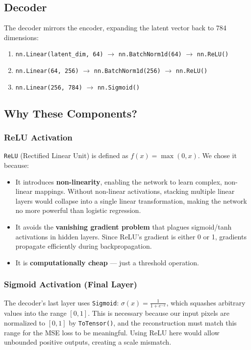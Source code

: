 \documentclass[12pt,a4paper]{article}
\begin{document}
\subsection{Decoder}
The decoder mirrors the encoder, expanding the latent vector back to 784 dimensions:
\begin{enumerate}
    \item \texttt{nn.Linear(latent\_dim, 64)} $\rightarrow$ \texttt{nn.BatchNorm1d(64)} $\rightarrow$ \texttt{\textcolor{accentorange}{nn.ReLU()}}
    \item \texttt{nn.Linear(64, 256)} $\rightarrow$ \texttt{nn.BatchNorm1d(256)} $\rightarrow$ \texttt{\textcolor{accentorange}{nn.ReLU()}}
    \item \texttt{nn.Linear(256, 784)} $\rightarrow$ \texttt{\textcolor{successgreen}{nn.Sigmoid()}}
\end{enumerate}

\subsection{Why These Components?}

\subsubsection{ReLU Activation}
\texttt{\textcolor{accentorange}{ReLU}} (Rectified Linear Unit) is defined as $f(x) = \max(0, x)$. We chose it because:
\begin{itemize}
    \item It introduces \textbf{non-linearity}, enabling the network to learn complex, non-linear mappings. Without non-linear activations, stacking multiple linear layers would collapse into a single linear transformation, making the network no more powerful than logistic regression.
    \item It avoids the \textbf{vanishing gradient problem} that plagues sigmoid/tanh activations in hidden layers. Since ReLU's gradient is either 0 or 1, gradients propagate efficiently during backpropagation.
    \item It is \textbf{computationally cheap} — just a threshold operation.
\end{itemize}

\subsubsection{Sigmoid Activation (Final Layer)}
The decoder's last layer uses \texttt{\textcolor{successgreen}{Sigmoid}}: $\sigma(x) = \frac{1}{1 + e^{-x}}$, which squashes arbitrary values into the range $[0, 1]$. This is necessary because our input pixels are normalized to $[0, 1]$ by \texttt{ToTensor()}, and the reconstruction must match this range for the MSE loss to be meaningful. Using ReLU here would allow unbounded positive outputs, creating a scale mismatch.
\end{document}
